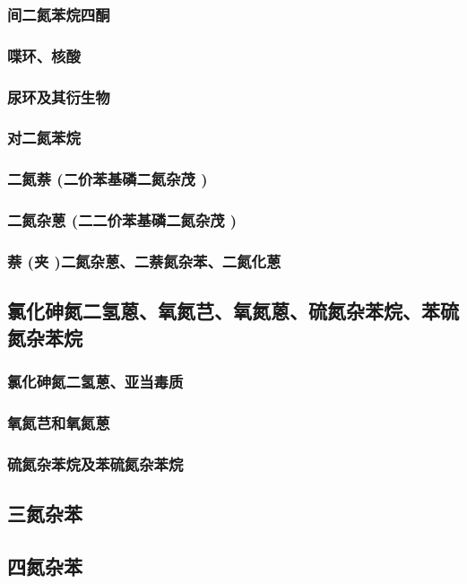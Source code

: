 \documentclass[UTF8]{../03-Chemistry}
\begin{document}
        \subsubsection{间二氮苯烷四酮}
        \subsubsection{喋环、核酸}
        \subsubsection{尿环及其衍生物}
        \subsubsection{对二氮苯烷}
        \subsubsection{二氮萘 (二价苯基磷二氮杂茂 )}
        \subsubsection{二氮杂蒽 (二二价苯基磷二氮杂茂 )}
        \subsubsection{萘 (夹 )二氮杂蒽、二萘氮杂苯、二氮化蒽}
    \subsection{氯化砷氮二氢蒽、氧氮芑、氧氮蒽、硫氮杂苯烷、苯硫氮杂苯烷}
        \subsubsection{氯化砷氮二氢蒽、亚当毒质}
        \subsubsection{氧氮芑和氧氮蒽}
        \subsubsection{硫氮杂苯烷及苯硫氮杂苯烷}
    \subsection{三氮杂苯}
    \subsection{四氮杂苯}
\end{document}
